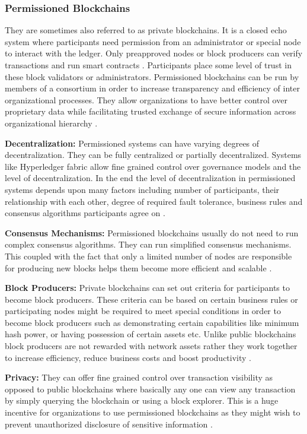 \subsubsection{Permissioned Blockchains}
They are sometimes also referred to as private blockchains. It is a closed echo system where participants need permission from an administrator or special node to interact with the ledger. Only preapproved nodes or block producers can verify transactions and run smart contracts \cite{misc:018}. Participants place some level of trust in these block validators or administrators. Permissioned blockchains can be run by members of a consortium in order to increase transparency and efficiency of inter organizational processes. They allow organizations to have better control over proprietary data while facilitating trusted exchange of secure information across organizational hierarchy \cite{misc:018} \cite{misc:017}.

\textbf{Decentralization:}
Permissioned systems can have varying degrees of decentralization. They can be fully centralized or partially decentralized. Systems like Hyperledger fabric allow fine grained control over governance models and the level of decentralization. In the end the level of decentralization in permissioned systems depends upon many factors including number of participants, their relationship with each other, degree of required fault tolerance, business rules and consensus algorithms participants agree on \cite{misc:018} \cite{misc:017}.

\textbf{Consensus Mechanisms:}
Permissioned blockchains usually do not need to run complex consensus algorithms. They can run simplified consensus mechanisms. This coupled with the fact that only a limited number of nodes are responsible for producing new blocks helps them become more efficient and scalable \cite{misc:018} \cite{misc:017}.

\textbf{Block Producers:}
Private blockchains can set out criteria for participants to become block producers. These criteria can be based on certain business rules or participating nodes might be required to meet special conditions in order to become block producers such as demonstrating certain capabilities like minimum hash power, or having possession of certain assets etc. Unlike public blockchains block producers are not rewarded with network assets rather they work together to increase efficiency, reduce business costs and boost productivity \cite{misc:018} \cite{misc:017}.
   
\textbf{Privacy:}
They can offer fine grained control over transaction visibility as opposed to public blockchains where basically any one can view any transaction by simply querying the blockchain or using a block explorer. This is a huge incentive for organizations to use permissioned blockchains as they might wish to prevent unauthorized disclosure of sensitive information \cite{misc:018} \cite{misc:017}.
\clearpage
